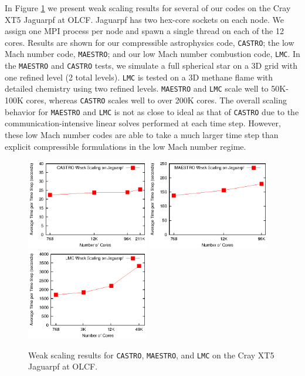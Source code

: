 In Figure \ref{fig:scaling} we present weak scaling results for several of our codes on 
the Cray XT5 Jaguarpf at OLCF. Jaguarpf has two hex-core sockets on each node. We assign 
one MPI process per node and spawn a single thread on each of the 12 cores. Results are 
shown for our compressible astrophysics code, {\tt CASTRO}; the low Mach number code, 
{\tt MAESTRO}; and our low Mach number combustion code, {\tt LMC}. In the {\tt MAESTRO} 
and {\tt CASTRO} tests, we simulate a full spherical star on a 3D grid with one refined 
level (2 total levels).  {\tt LMC} is tested on a 3D methane flame with detailed chemistry 
using two refined levels. {\tt MAESTRO} and {\tt LMC} scale well to 50K-100K cores, 
whereas {\tt CASTRO} scales well to over 200K cores. The overall scaling behavior 
for {\tt MAESTRO} and {\tt LMC} is not as close to ideal as that of {\tt CASTRO} 
due to the communication-intensive linear solves performed at each time step. However, 
these low Mach number codes are able to take a much larger time step than explicit 
compressible formulations in the low Mach number regime. 
\begin{figure}[htb]
\centering
\includegraphics[width=2.1in]{./Introduction/castro_scaling}
\includegraphics[width=2.1in]{./Introduction/maestro_scaling}
\includegraphics[width=2.1in]{./Introduction/lmc_scaling}
\caption{\label{fig:scaling}Weak scaling results for {\tt CASTRO}, {\tt MAESTRO}, and
{\tt LMC} on the Cray XT5 Jaguarpf at OLCF.}
\end{figure}

